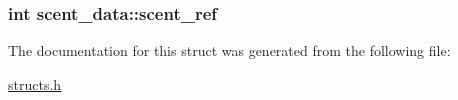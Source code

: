 \hypertarget{structscent__data_a64174fd9dd5bc5edad6de404adde9207}{
\subsubsection[{scent\-\_\-ref}]{\setlength{\rightskip}{0pt plus 5cm}int scent\-\_\-data\-::scent\-\_\-ref}}\label{structscent__data_a64174fd9dd5bc5edad6de404adde9207}


The documentation for this struct was generated from the following file\-:\begin{DoxyCompactItemize}
\item 
\hyperlink{structs_8h}{structs.\-h}\end{DoxyCompactItemize}
